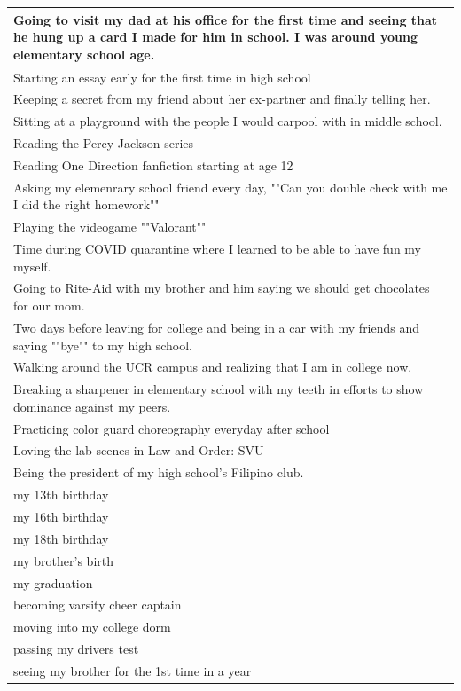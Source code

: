 \documentclass[
  .7em,
  letterpaper,
  DIV=11,
  numbers=noendperiod]{scrartcl}
\begin{document}
\begin{table}
\begin{tabular}{l}
\hline
Going to visit my dad at his office for the first time and seeing that he hung up a card I made for him in school. I was around young elementary school age.\\
\hline
Starting an essay early for the first time in high school\\
\hline
Keeping a secret from my friend about her ex-partner and finally telling her.\\
\hline
Sitting at a playground with the people I would carpool with in middle school.\\
\hline
Reading the Percy Jackson series\\
\hline
Reading One Direction fanfiction starting at age 12\\
\hline
Asking my elemenrary school friend every day, ""Can you double check with me I did the right homework""\\
\hline
Playing the videogame ""Valorant""\\
\hline
Time during COVID quarantine where I learned to be able to have fun my myself.\\
\hline
Going to Rite-Aid with my brother and him saying we should get chocolates for our mom.\\
\hline
Two days before leaving for college and being in a car with my friends and saying ""bye"" to my high school.\\
\hline
Walking around the UCR campus and realizing that I am in college now.\\
\hline
Breaking a sharpener in elementary school with my teeth in efforts to show dominance against my peers.\\
\hline
Practicing color guard choreography everyday after school\\
\hline
Loving the lab scenes in Law and Order: SVU\\
\hline
Being the president of my high school's Filipino club.\\
\hline
my 13th birthday\\
\hline
my 16th birthday\\
\hline
my 18th birthday\\
\hline
my brother's birth\\
\hline
my graduation\\
\hline
becoming varsity cheer captain\\
\hline
moving into my college dorm\\
\hline
passing my drivers test\\
\hline
seeing my brother for the 1st time in a year\\

\end{tabular}
\end{table}
\end{document}
